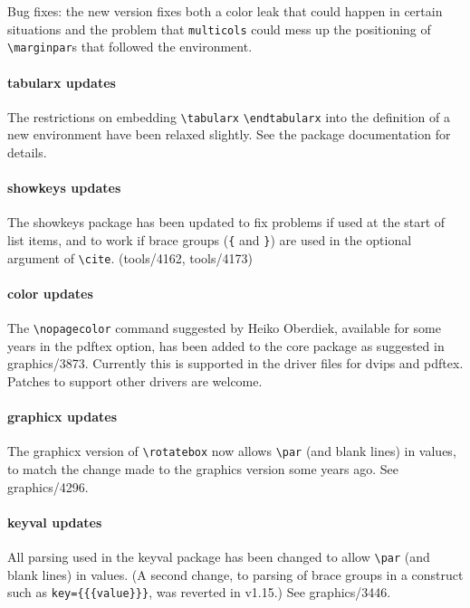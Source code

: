 \documentclass{ltnews}
\begin{document}
Bug fixes: the new version fixes both a color leak that could happen
in certain situations and the problem that \texttt{multicols} could
mess up the positioning of \verb=\marginpar=s that followed the
environment.


\paragraph{\textsf{tabularx} updates}

The restrictions on embedding \verb|\tabularx| \verb|\endtabularx|
into the definition of a new environment have been relaxed
slightly. See the package documentation for details.

\paragraph{\textsf{showkeys} updates}

The \textsf{showkeys} package has been updated to fix problems if used
at the start of list items, and to work if brace groups (\verb|{| and
\verb|}|) are used in the optional argument of
\verb|\cite|. (tools/4162, tools/4173)


\paragraph{\textsf{color} updates}

The \verb|\nopagecolor| command suggested by Heiko Oberdiek, 
available for some years in the \textsf{pdftex} option, has been
added to the core package as suggested in graphics/3873. Currently
this is supported in the driver files for \textsf{dvips} and
\textsf{pdftex}.  Patches to support other drivers are welcome.

 \paragraph{\textsf{graphicx} updates}

The \textsf{graphicx} version of \verb|\rotatebox| now allows 
\verb|\par| (and blank lines) in values, to match the change made
to the \textsf{graphics} version some years ago. See graphics/4296.


\paragraph{\textsf{keyval} updates}

All parsing used in the \textsf{keyval} package has been changed
to allow \verb|\par| (and blank lines) in values.
(A second change, to parsing of brace groups
in a construct such as \texttt{key=\{\{\{value\}\}\}}, was reverted in v1.15.)
See graphics/3446.
\end{document}
